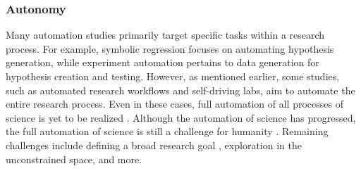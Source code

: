



\subsubsection{Autonomy}
Many automation studies primarily target specific tasks within a research process. For example, symbolic regression focuses on automating hypothesis generation, while experiment automation pertains to data generation for hypothesis creation and testing. However, as mentioned earlier, some studies, such as automated research workflows and self-driving labs, aim to automate the entire research process. Even in these cases, full automation of all processes of science is yet to be realized \cite{zenil2023}. Although the automation of science has progressed, the full automation of science is still a challenge for humanity \cite{coley2020autonomous}. Remaining challenges include defining a broad research goal \cite{zenil2023,coley2020autonomous}, exploration \cite{coley2020autonomous} in the unconstrained space, and more.

